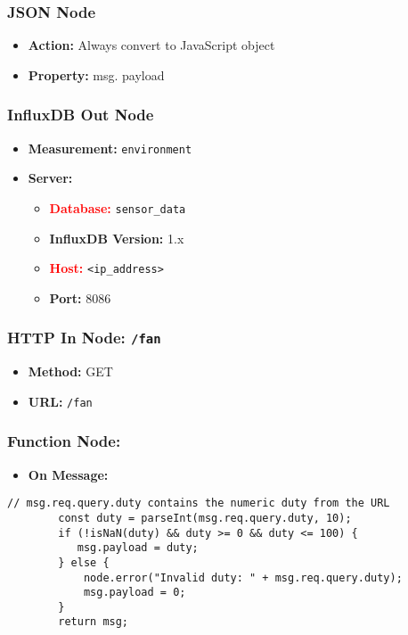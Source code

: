 \documentclass[onecolumn]{article}
\begin{document}
\subsubsection*{JSON Node}

\begin{itemize}
  \item \textbf{Action:} Always convert to JavaScript object
  \item \textbf{Property:} msg. payload
\end{itemize}

\subsubsection*{InfluxDB Out Node}

\begin{itemize}
  \item \textbf{Measurement:} \texttt{environment}
  \item \textbf{Server:}
    \begin{itemize}
      \item \textcolor{red}{\textbf{Database:}} \texttt{sensor\_data}
      \item \textbf{InfluxDB Version:} 1.x
      \item \textcolor{red}{\textbf{Host:}} \texttt{<ip\_address>}
      \item \textbf{Port:} 8086
    \end{itemize}
\end{itemize}

\subsubsection*{HTTP In Node: \texttt{/fan}}

\begin{itemize}
  \item \textbf{Method:} GET
  \item \textbf{URL:} \texttt{/fan}
\end{itemize}

\subsubsection*{Function Node:}

\begin{itemize}
  \item \textbf{On Message:}
\end{itemize}

\begin{lstlisting}[numbers=none]
        // msg.req.query.duty contains the numeric duty from the URL
        const duty = parseInt(msg.req.query.duty, 10);
        if (!isNaN(duty) && duty >= 0 && duty <= 100) {
           msg.payload = duty;
        } else {
            node.error("Invalid duty: " + msg.req.query.duty);
            msg.payload = 0;
        }
        return msg;
\end{lstlisting}
\end{document}
